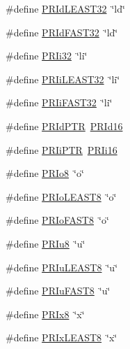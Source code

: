 \begin{DoxyCompactItemize}
\item 
\#define \hyperlink{group__avr__inttypes_gad36a6b276bd808d713cc5603ba008c58}{P\+R\+Id\+L\+E\+A\+S\+T32}~\char`\"{}ld\char`\"{}
\item 
\#define \hyperlink{group__avr__inttypes_gaef5a98227a6af5fde95353ed303cfd1e}{P\+R\+Id\+F\+A\+S\+T32}~\char`\"{}ld\char`\"{}
\item 
\#define \hyperlink{group__avr__inttypes_gae212e57631ec729f70e0cc42e51dd91e}{P\+R\+Ii32}~\char`\"{}li\char`\"{}
\item 
\#define \hyperlink{group__avr__inttypes_gad7a1bae7ca12c7b5415fae1b3f258207}{P\+R\+Ii\+L\+E\+A\+S\+T32}~\char`\"{}li\char`\"{}
\item 
\#define \hyperlink{group__avr__inttypes_ga192a69a2e6e63ed8393d306b4078d63f}{P\+R\+Ii\+F\+A\+S\+T32}~\char`\"{}li\char`\"{}
\item 
\#define \hyperlink{group__avr__inttypes_ga7c8a9ccd40bd2053ca588d1b15e76a30}{P\+R\+Id\+P\+TR}~\hyperlink{group__avr__inttypes_ga087e50fe0283aacc71d7138d13e91939}{P\+R\+Id16}
\item 
\#define \hyperlink{group__avr__inttypes_gac2d52bf83b783f530f02fa2eeabe703a}{P\+R\+Ii\+P\+TR}~\hyperlink{group__avr__inttypes_ga655e9b358e0371a4bf5ff21cc08273e3}{P\+R\+Ii16}
\item 
\#define \hyperlink{group__avr__inttypes_gad12493b9063f7b2630b90b7f9a7f3301}{P\+R\+Io8}~\char`\"{}o\char`\"{}
\item 
\#define \hyperlink{group__avr__inttypes_gaa5b3ca8091f4ed7d43f5eb971ce11114}{P\+R\+Io\+L\+E\+A\+S\+T8}~\char`\"{}o\char`\"{}
\item 
\#define \hyperlink{group__avr__inttypes_ga37f93445f1795033c9ba577661da6a91}{P\+R\+Io\+F\+A\+S\+T8}~\char`\"{}o\char`\"{}
\item 
\#define \hyperlink{group__avr__inttypes_ga8673208d2d48018fcce020ef59f8ec4f}{P\+R\+Iu8}~\char`\"{}u\char`\"{}
\item 
\#define \hyperlink{group__avr__inttypes_ga74cb15b101649124009c010a9055e885}{P\+R\+Iu\+L\+E\+A\+S\+T8}~\char`\"{}u\char`\"{}
\item 
\#define \hyperlink{group__avr__inttypes_ga0b0c7ad693c391e3e353e8f2d1df2ec3}{P\+R\+Iu\+F\+A\+S\+T8}~\char`\"{}u\char`\"{}
\item 
\#define \hyperlink{group__avr__inttypes_gadac1acc1d24060aeee7791a99d1a3a8c}{P\+R\+Ix8}~\char`\"{}x\char`\"{}
\item 
\#define \hyperlink{group__avr__inttypes_ga45d80a42b6cd25f3ed57b0e800e6e398}{P\+R\+Ix\+L\+E\+A\+S\+T8}~\char`\"{}x\char`\"{}

\end{DoxyCompactItemize}
